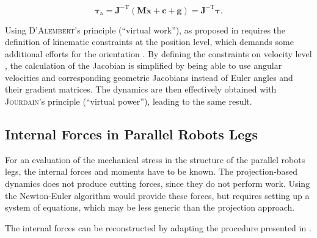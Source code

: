 \documentclass[fleqn,a4paper,10pt]{article}
\newcommand{\bm}[1]{\mathbf{#1}}
\newcommand{\transp}[0]{{\mathrm{T}}}
\renewenvironment{figure}
  {\par\vspace{6pt}\noindent\minipage{\linewidth}}
  {\endminipage\par\vspace{6pt}}
\begin{document}
\begin{multicols}{2}
\begin{equation}
\bm{\tau}_\mathrm{a}
=\bm{J}^{-\transp} (\bm{M}\ddot{\bm{x}}+\bm{c}+\bm{g})
=\bm{J}^{-\transp} \bm{\tau}.
\label{equ:actforce}
\end{equation}

Using \textsc{D'Alembert}'s principle (``virtual work''), as proposed in \cite{DoThanhKotHeiOrt2009b} requires the definition of kinematic constraints at the position level, which demands some additional efforts for the orientation \cite{SchapplerTapOrt2019c}.
By defining the constraints on velocity level \cite{Gogu2008}, the calculation of the Jacobian is simplified by being able to use angular velocities and corresponding geometric Jacobians instead of Euler angles and their gradient matrices.
The dynamics are then effectively obtained with \textsc{Jourdain}'s principle (``virtual power''), leading to the same result.

\subsection{Internal Forces in Parallel Robots Legs}
\label{sec:intforce}

For an evaluation of the mechanical stress in the structure of the parallel robots legs, the internal forces and moments have to be known.
The projection-based dynamics does not produce cutting forces, since they do not perform work.
Using the Newton-Euler algorithm would provide these forces, but requires setting up a system of equations, which may be less generic than the projection approach.

The internal forces can be reconstructed by adapting the procedure presented in \cite{KhalilGue2004}.


\begin{figure}
\centering

\label{fig:PKM_internal_forces}
\end{figure}


\end{multicols}
\end{document}
